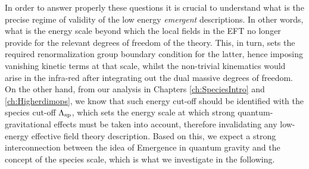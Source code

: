In order to answer properly these questions it is crucial to understand what is the precise regime of validity of the low energy \emph{emergent} descriptions. In other words, what is the energy scale beyond which the local fields in the EFT no longer provide for the relevant degrees of freedom of the theory. This, in turn, sets the required renormalization group boundary condition for the latter, hence imposing vanishing kinetic terms at that scale, whilst the non-trivial kinematics would arise in the infra-red after integrating out the dual massive degrees of freedom. On the other hand, from our analysis in Chapters \ref{ch:SpeciesIntro} and \ref{ch:Higherdimops}, we know that such energy cut-off should be identified with the species cut-off $\Lambda_{\text{sp}}$, which sets the energy scale at which strong quantum-gravitational effects must be taken into account, therefore invalidating any low-energy effective field theory description. Based on this, we expect a strong interconnection between the idea of Emergence in quantum gravity and the concept of the species scale, which is what we investigate in the following.

	
